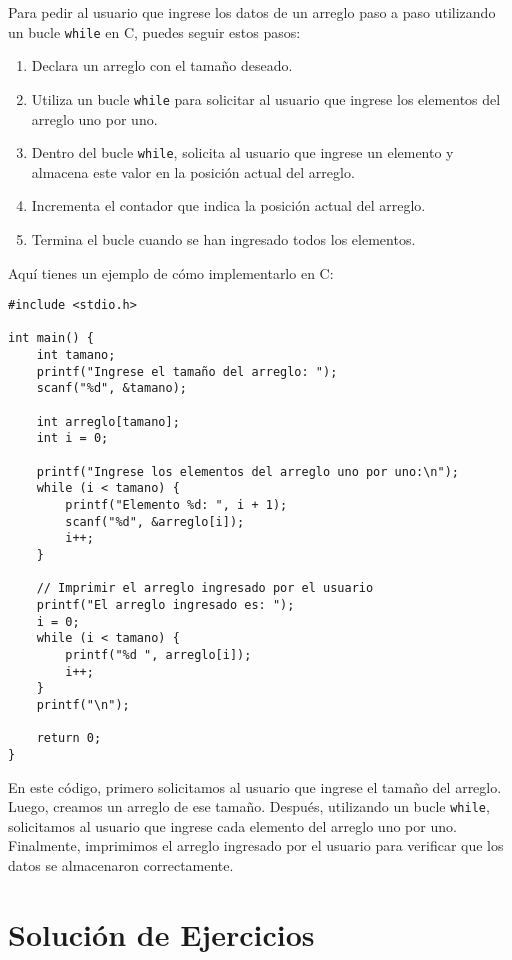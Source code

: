 \documentclass{article}
\begin{document}
Para pedir al usuario que ingrese los datos de un arreglo paso a paso utilizando un bucle \texttt{while} en C, puedes seguir estos pasos:

\begin{enumerate}
    \item Declara un arreglo con el tamaño deseado.
    \item Utiliza un bucle \texttt{while} para solicitar al usuario que ingrese los elementos del arreglo uno por uno.
    \item Dentro del bucle \texttt{while}, solicita al usuario que ingrese un elemento y almacena este valor en la posición actual del arreglo.
    \item Incrementa el contador que indica la posición actual del arreglo.
    \item Termina el bucle cuando se han ingresado todos los elementos.
\end{enumerate}

Aquí tienes un ejemplo de cómo implementarlo en C:

\begin{verbatim}
#include <stdio.h>

int main() {
    int tamano;
    printf("Ingrese el tamaño del arreglo: ");
    scanf("%d", &tamano);

    int arreglo[tamano];
    int i = 0;

    printf("Ingrese los elementos del arreglo uno por uno:\n");
    while (i < tamano) {
        printf("Elemento %d: ", i + 1);
        scanf("%d", &arreglo[i]);
        i++;
    }

    // Imprimir el arreglo ingresado por el usuario
    printf("El arreglo ingresado es: ");
    i = 0;
    while (i < tamano) {
        printf("%d ", arreglo[i]);
        i++;
    }
    printf("\n");

    return 0;
}
\end{verbatim}

En este código, primero solicitamos al usuario que ingrese el tamaño del arreglo. Luego, creamos un arreglo de ese tamaño. Después, utilizando un bucle \texttt{while}, solicitamos al usuario que ingrese cada elemento del arreglo uno por uno. Finalmente, imprimimos el arreglo ingresado por el usuario para verificar que los datos se almacenaron correctamente.

\section{Solución de Ejercicios}
\end{document}
